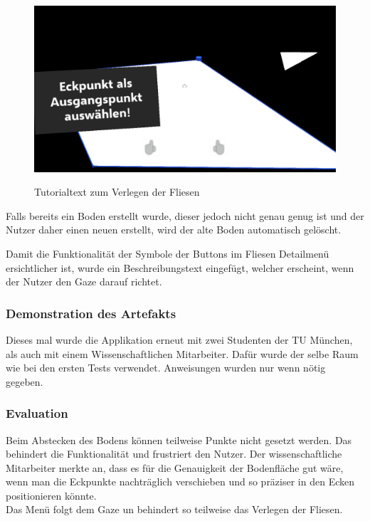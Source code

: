 \begin{figure}[h]
	\begin{center}
		\noindent\includegraphics[scale=0.4]{Resources/Artefakt/verlegenText.png}
		\label{tutFliesen}
		\caption{Tutorialtext zum Verlegen der Fliesen}	
	\end{center}
\end{figure}

Falls bereits ein Boden erstellt wurde, dieser jedoch nicht genau genug ist und der Nutzer daher einen neuen erstellt, wird der alte Boden automatisch gelöscht.

Damit die Funktionalität der Symbole der Buttons im Fliesen Detailmenü ersichtlicher ist, wurde ein Beschreibungstext eingefügt, welcher erscheint, wenn der Nutzer den Gaze darauf richtet.

\subsubsection{Demonstration des Artefakts}

Dieses mal wurde die Applikation erneut mit zwei Studenten der TU München, als auch mit einem Wissenschaftlichen Mitarbeiter. Dafür wurde der selbe Raum wie bei den ersten Tests verwendet. Anweisungen wurden nur wenn nötig gegeben.

\subsubsection{Evaluation}

Beim Abstecken des Bodens können teilweise Punkte nicht gesetzt werden. Das behindert die Funktionalität und frustriert den Nutzer. Der wissenschaftliche Mitarbeiter merkte an, dass es für die Genauigkeit der Bodenfläche gut wäre, wenn man die Eckpunkte nachträglich verschieben und so präziser in den Ecken positionieren könnte. \\
Das Menü folgt dem Gaze un behindert so teilweise das Verlegen der Fliesen.

